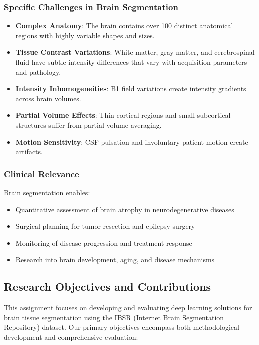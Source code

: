 \documentclass[12pt,a4paper]{article}
\begin{document}
\subsubsection{Specific Challenges in Brain Segmentation}
\begin{itemize}
    \item \textbf{Complex Anatomy}: The brain contains over 100 distinct anatomical regions with highly variable shapes and sizes.
    \item \textbf{Tissue Contrast Variations}: White matter, gray matter, and cerebrospinal fluid have subtle intensity differences that vary with acquisition parameters and pathology.
    \item \textbf{Intensity Inhomogeneities}: B1 field variations create intensity gradients across brain volumes.
    \item \textbf{Partial Volume Effects}: Thin cortical regions and small subcortical structures suffer from partial volume averaging.
    \item \textbf{Motion Sensitivity}: CSF pulsation and involuntary patient motion create artifacts.
\end{itemize}

\subsubsection{Clinical Relevance}
Brain segmentation enables:
\begin{itemize}
    \item Quantitative assessment of brain atrophy in neurodegenerative diseases
    \item Surgical planning for tumor resection and epilepsy surgery
    \item Monitoring of disease progression and treatment response
    \item Research into brain development, aging, and disease mechanisms
\end{itemize}

\subsection{Research Objectives and Contributions}

This assignment focuses on developing and evaluating deep learning solutions for brain tissue segmentation using the IBSR (Internet Brain Segmentation Repository) dataset. Our primary objectives encompass both methodological development and comprehensive evaluation:
\end{document}
